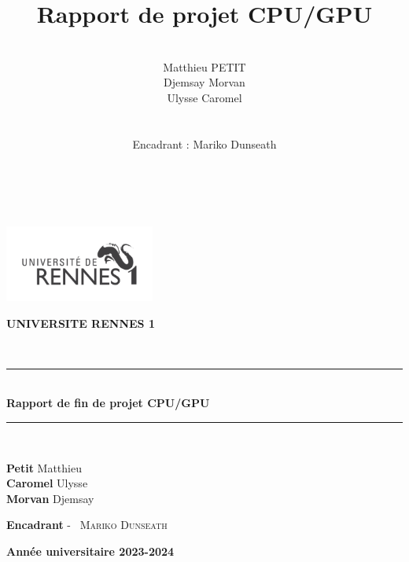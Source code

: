 \documentclass[10pt,a4paper]{article}
\title{Rapport de projet CPU/GPU}
\author{\\Matthieu PETIT\\Djemsay Morvan\\Ulysse Caromel\\\\\\
Encadrant : Mariko Dunseath\\\\\\}
\begin{document}



\begin{titlepage}

    \begin{center}
        \begin{center}
            \includegraphics[height=2.5cm]{../Images/univ-rennes1.png}
            
        \end{center}
        \begin{center}
            \textbf{UNIVERSITE RENNES 1 }
        \end{center}
        \textsc{\Large }\\[2.5cm]
    \rule{\linewidth}{0.3mm} \\[0.4cm]
    { \huge \bfseries Rapport de fin de projet CPU/GPU \\[0.4cm] }
    \rule{\linewidth}{0.3mm} \\[3cm]
    
    
    \noindent
    \begin{center}
        \textbf{Petit} Matthieu\\
        \textbf{Caromel} Ulysse\\
        \textbf{Morvan} Djemsay\\
    \end{center}
        
    \color{black}
    \centering
    \vfill
    \large \textbf{Encadrant} - ~\textsc{Mariko Dunseath} 
    
    \vfill
    
    {\textbf{\large {Année universitaire} 2023-2024}}
    
    \end{center}
\end{titlepage}

\newpage

\tableofcontents

\newpage
\end{document}

